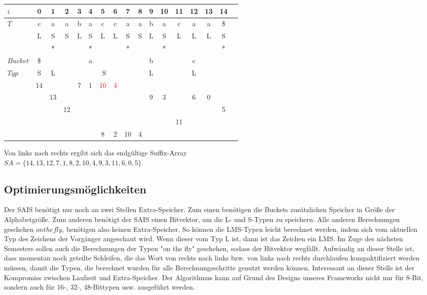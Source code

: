 \begin{center}
  \begin{tabular}{ | l | c | c | c | c | c | c | c | c | c | c | c | c | c | c | c | c | }
    \hline
        $i$ & 0 & 1 & 2 & 3 & 4 & 5 & 6 & 7 & 8 & 9 & 10 & 11 & 12 & 13 & 14 \\ \hline
        $T$ & c & a & a & b & a & c & c & a & a & b & a & c & a & a & \$ \\ \hline
            & L & S & S & L & S & L & L & S & S & L & S & L & L & L & S \\ \hline
            &   & * &   &   & * &   &   & * &   &   & * &   &   &   & * \\ \hline
   $Bucket$ &\$ & \multicolumn{7}{c}{a} &   & \multicolumn{1}{c}{b} &   & \multicolumn{3}{c}{c} & \\ \hline
      $Typ$ & S & \multicolumn{1}{c}{L} &   & \multicolumn{5}{c}{S} &   & \multicolumn{1}{c}{L} &    & \multicolumn{3}{c}{L} &\\ \hline
            & 14 & & & 7 & 1 & \textcolor{red}{10} & \textcolor{red}{4} & & &  &   & &   &   &  \\ \hline
            & & 13 & & & & & & & & 9 & 3 & & 6 & 0 & \\ \hline
            &  &  & 12 & & & & & & & & & & &  & 5 \\ \hline
            & & & & & &   & & &   &   & & 11 & & & \\ \hline
            & & & & & & 8 & 2 & 10 & 4 &   & &   &   &   & \\
    \hline
  \end{tabular}
\end{center}
\bigskip
Von links nach rechts ergibt sich das endgültige Suffix-Array \\
$SA = \{14, 13, 12, 7, 1, 8, 2, 10, 4, 9, 3, 11, 6, 0, 5\}$.

\subsection{Optimierungsmöglichkeiten}
Der SAIS benötigt nur noch an zwei Stellen Extra-Speicher. Zum einen benötigen die Buckets zusätzlichen Speicher in Größe der Alphabetgröße. Zum anderen benötigt der SAIS einen Bitvektor, um die L- und S-Typen zu speichern. Alle anderen Berechnungen geschehen $on the fly$, benötigen also keinen Extra-Speicher. So können die LMS-Typen leicht berechnet werden, indem sich vom aktuellen Typ des Zeichens der Vorgänger angeschaut wird. Wenn dieser vom Typ L ist, dann ist das Zeichen ein LMS. Im Zuge des nächsten Semesters sollen auch die Berechnungen der Typen "on the fly" geschehen, sodass der Bitvektor wegfällt. Aufwändig an dieser Stelle ist, dass momentan noch geteilte Schleifen, die das Wort von rechts nach links bzw. von links nach rechts durchlaufen kompaktifiziert werden müssen, damit die Typen, die berechnet wurden für alle Berechnungsschritte genutzt werden können. Interessant an dieser Stelle ist der Kompromiss zwischen Laufzeit und Extra-Speicher. Der Algorithmus kann auf Grund des Designs unseres Frameworks nicht nur für 8-Bit, sondern auch für 16-, 32-, 48-Bittypen usw. ausgeführt werden.

